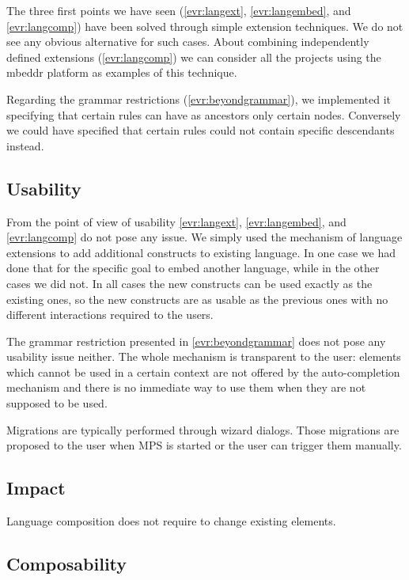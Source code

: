 \documentclass[preprint,numbers,10pt]{sigplanconf}
\begin{document}
The three first points we have seen (\ref{evr:langext}, \ref{evr:langembed}, and \ref{evr:langcomp}) have been solved through simple extension techniques. We do not see any obvious alternative for such cases. About combining independently defined extensions (\ref{evr:langcomp}) we can consider all the projects using the mbeddr platform as examples of this technique.

Regarding the grammar restrictions (\ref{evr:beyondgrammar}), we implemented it specifying that certain rules can have as ancestors only certain nodes. Conversely we could have specified that certain rules could not contain specific descendants instead.

\subsection{Usability}

From the point of view of usability \ref{evr:langext}, \ref{evr:langembed}, and \ref{evr:langcomp} do not pose any issue. We simply used the mechanism of language extensions to add additional constructs to existing language. In one case we had done that for the specific goal to embed another language, while in the other cases we did not. In all cases the new constructs can be used exactly as the existing ones, so the new constructs are as usable as the previous ones with no different interactions required to the users.

The grammar restriction presented in \ref{evr:beyondgrammar} does not pose any usability issue neither. The whole mechanism is transparent to the user: elements which cannot be used in a certain context are not offered by the auto-completion mechanism and there is no immediate way to use them when they are not supposed to be used.

Migrations are typically performed through wizard dialogs. Those migrations are proposed to the user when MPS is started or the user can trigger them manually.

\subsection{Impact}

Language composition does not require to change existing elements.

\subsection{Composability}
\end{document}
